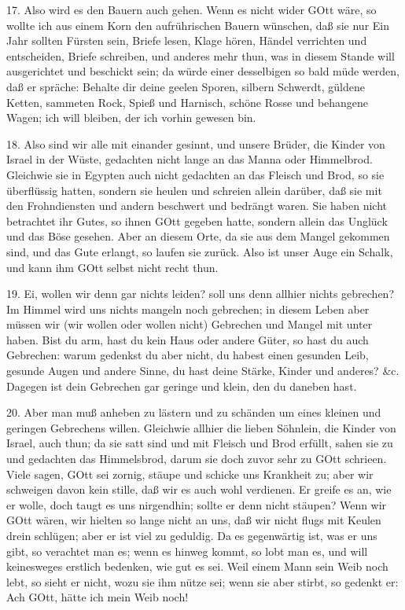 17. Also wird es den Bauern auch gehen. Wenn es nicht wider GOtt wäre, so wollte ich aus einem Korn den aufrührischen Bauern wünschen, daß sie nur Ein Jahr sollten Fürsten sein, Briefe lesen, Klage hören, Händel verrichten und entscheiden, Briefe schreiben, und anderes mehr thun, was in diesem Stande will ausgerichtet und beschickt sein; da würde einer desselbigen so bald müde werden, daß er spräche: Behalte dir deine geelen Sporen, silbern Schwerdt, güldene Ketten, sammeten Rock, Spieß und Harnisch, schöne Rosse und behangene Wagen; ich will bleiben, der ich vorhin gewesen bin.

18. Also sind wir alle mit einander gesinnt, und unsere Brüder, die Kinder von Israel in der Wüste, gedachten nicht lange an das Manna oder Himmelbrod. Gleichwie sie in Egypten auch nicht gedachten an das Fleisch und Brod, so sie überflüssig hatten, sondern sie heulen und
schreien allein darüber, daß sie mit den Frohndiensten und andern beschwert und bedrängt waren. Sie haben nicht betrachtet ihr Gutes, so ihnen GOtt gegeben hatte, sondern allein das Unglück und das Böse gesehen. Aber an diesem Orte, da sie aus dem Mangel gekommen sind, und das Gute erlangt, so laufen sie zurück. Also ist unser Auge ein Schalk, und kann ihm GOtt selbst nicht recht thun.

19. Ei, wollen wir denn gar nichts leiden? soll uns denn allhier nichts gebrechen? Im Himmel wird uns nichts mangeln noch gebrechen; in diesem Leben aber müssen wir (wir wollen oder wollen nicht) Gebrechen und Mangel mit unter haben. Bist du arm, hast du kein Haus oder andere Güter, so hast du auch Gebrechen: warum gedenkst du aber nicht, du habest einen gesunden Leib, gesunde Augen und andere Sinne, du hast deine Stärke, Kinder und anderes? \&c. Dagegen ist dein Gebrechen gar geringe und klein, den du daneben hast.

20. Aber man muß anheben zu lästern und zu schänden um eines kleinen und geringen Gebrechens willen. Gleichwie allhier die lieben Söhnlein, die Kinder von Israel, auch thun; da sie satt sind und mit Fleisch und Brod erfüllt, sahen sie zu und gedachten das Himmelsbrod, darum sie doch zuvor sehr zu GOtt schrieen. Viele sagen, GOtt sei zornig, stäupe und schicke uns Krankheit zu; aber wir schweigen davon kein stille, daß wir es auch wohl verdienen. Er greife es an, wie er wolle, doch taugt es uns nirgendhin; sollte er denn nicht stäupen? Wenn wir GOtt wären, wir hielten so lange nicht an uns, daß wir nicht flugs mit Keulen drein schlügen; aber er ist viel zu geduldig. Da es gegenwärtig ist, was er uns gibt, so verachtet man es; wenn es hinweg kommt, so lobt man es, und will keinesweges erstlich bedenken, wie gut es sei. Weil einem Mann sein Weib noch lebt, so sieht er nicht, wozu sie ihm nütze sei; wenn sie aber stirbt, so gedenkt er: Ach GOtt, hätte ich mein Weib noch!

